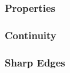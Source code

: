 

\begin{frame}
	\frametitle{Properties}
\end{frame}


\begin{frame}
	\frametitle{Continuity}
\end{frame}

\begin{frame}
	\frametitle{Sharp Edges}
\end{frame}